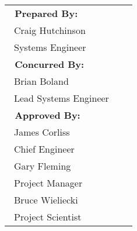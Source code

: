 \bfseries
\sffamily
{}
\vspace{0.1in}
\raggedright
\normalfont
\begin{table}[htbp]
\begin{minipage}{\linewidth}
\centering
\small
\begin{tabulary}{\textwidth}{p{3.325in}p{0.225in}p{2.5in}}
\bfseries{~Prepared By:} & & \\[0.35in]
\cmidrule(l){1-1}%
~Craig Hutchinson\\
~Systems Engineer\\[0.25in]
\bfseries{~Concurred By:} & & \\[0.35in]
\cmidrule(l){1-1}%
~Brian Boland & &  \\
~Lead Systems Engineer & &  \\[0.35in]
\bfseries{~Approved By:} & & \\[0.35in]
\cmidrule(l){1-1}%
~James Corliss & &  \\
~Chief Engineer & &  \\[0.35in]
\cmidrule(l){1-1}%
~Gary Fleming & &  \\
~Project Manager & &  \\[0.35in]
\cmidrule(l){1-1}%
~Bruce Wieliecki & &  \\
~Project Scientist & &  \\[0.4in]
\end{tabulary}
\end{minipage}
\end{table}
\clearpage